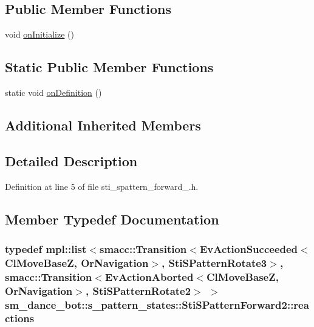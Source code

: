 \subsection*{Public Member Functions}
\begin{DoxyCompactItemize}
\item 
void \hyperlink{structsm__dance__bot_1_1s__pattern__states_1_1StiSPatternForward2_a806e3380c84991aa423956a576246323}{on\+Initialize} ()
\end{DoxyCompactItemize}
\subsection*{Static Public Member Functions}
\begin{DoxyCompactItemize}
\item 
static void \hyperlink{structsm__dance__bot_1_1s__pattern__states_1_1StiSPatternForward2_a67541426da0bfd37f7c95f59181ddf8b}{on\+Definition} ()
\end{DoxyCompactItemize}
\subsection*{Additional Inherited Members}


\subsection{Detailed Description}


Definition at line 5 of file sti\+\_\+spattern\+\_\+forward\+\_.\+h.



\subsection{Member Typedef Documentation}
\subsubsection[{\texorpdfstring{reactions}{reactions}}]{\setlength{\rightskip}{0pt plus 5cm}typedef mpl\+::list$<${\bf smacc\+::\+Transition}$<$Ev\+Action\+Succeeded$<${\bf Cl\+Move\+BaseZ}, {\bf Or\+Navigation}$>$, {\bf Sti\+S\+Pattern\+Rotate3}$>$, {\bf smacc\+::\+Transition}$<$Ev\+Action\+Aborted$<${\bf Cl\+Move\+BaseZ}, {\bf Or\+Navigation}$>$, {\bf Sti\+S\+Pattern\+Rotate2}$>$ $>$ {\bf sm\+\_\+dance\+\_\+bot\+::s\+\_\+pattern\+\_\+states\+::\+Sti\+S\+Pattern\+Forward2\+::reactions}}\hypertarget{structsm__dance__bot_1_1s__pattern__states_1_1StiSPatternForward2_a6556b5d7dccbe50ee512704f3bc894fb}{}\label{structsm__dance__bot_1_1s__pattern__states_1_1StiSPatternForward2_a6556b5d7dccbe50ee512704f3bc894fb}


